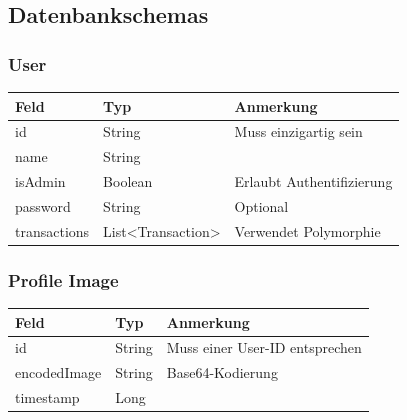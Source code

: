 \documentclass[a4paper, 11pt]{article}
\begin{document}
\subsection*{Datenbankschemas}
\label{subsec:attachments:schemas}

\subsubsection*{User}
\label{subsubsec:attachments:schemas:user}
\begin{table}[H]
	\centering
	\begin{tabular}{@{}lll@{}}
		Feld         & Typ                                      & Anmerkung             \\ \toprule
		id           & String                                   & Muss einzigartig sein \\ \midrule
		name         & String                                   &                       \\ \midrule
		isAdmin      & Boolean                                  & Erlaubt Authentifizierung \\ \midrule
		password     & String                                   & Optional              \\ \midrule
		transactions & List\textless{}Transaction\textgreater{} & Verwendet Polymorphie \\ \bottomrule
	\end{tabular}
	\label{tab:attachments:schemas:user}
\end{table}

\subsubsection*{Profile Image}
\label{subsubsec:attachments:schemas:profileimage}
\begin{table}[H]
	\centering
	\begin{tabular}{@{}lll@{}}
		Feld         & Typ    & Anmerkung                      \\ \toprule
		id           & String & Muss einer User-ID entsprechen \\ \midrule
		encodedImage & String & Base64-Kodierung               \\ \midrule
		timestamp    & Long   &                                \\ \bottomrule
	\end{tabular}
	\label{tab:attachments:schemas:profileimage}
\end{table}
\end{document}
